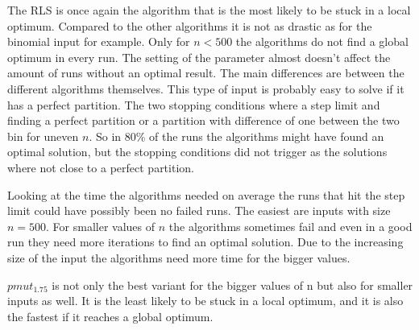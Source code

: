 The RLS is once again the algorithm that is the most likely to be stuck in a local optimum.
Compared to the other algorithms it is not as drastic as for the binomial input for example.
Only for $n<500$ the algorithms do not find a global optimum in every run.
The setting of the parameter almost doesn't affect the amount of runs without an optimal result.
The main differences are between the different algorithms themselves.
This type of input is probably easy to solve if it has a perfect partition.
The two stopping conditions where a step limit and finding a perfect partition or a partition with difference of one between the two bin for uneven $n$.
So in 80\% of the runs the algorithms might have found an optimal solution, but the stopping conditions did not trigger as the solutions where not close to a perfect partition.



Looking at the time the algorithms needed on average the runs that hit the step limit could have possibly been no failed runs.
The easiest are inputs with size $n=500$.
For smaller values of $n$ the algorithms sometimes fail and even in a good run they need more iterations to find an optimal solution.
Due to the increasing size of the input the algorithms need more time for the bigger values.



$pmut_1.75$ is not only the best variant for the bigger values of n but also for smaller inputs as well.
It is the least likely to be stuck in a local optimum, and it is also the fastest if it reaches a global optimum.
